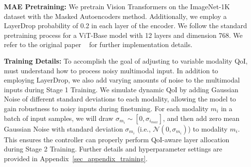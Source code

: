 \textbf{MAE Pretraining:} We pretrain Vision Transformers on the ImageNet-1K dataset with the Masked Autoencoders method. Additionally, we employ a LayerDrop probability of 0.2 in each layer of the encoder. We follow the standard pretraining process for a ViT-Base model with 12 layers and dimension 768. We refer to the original paper ~\cite{he2022masked} for further implementation details. 


\textbf{Training Details:}
To accomplish the goal of adjusting to variable modality QoI, \name must understand how to process noisy multimodal input. 
In addition to employing LayerDrop, we also add varying amounts of noise to the multimodal inputs during Stage 1 Training. We simulate dynamic QoI by adding Gaussian Noise of different standard deviations to each modality, allowing the model to gain robustness to noisy inputs during finetuning. For each modality $m_i$ in a batch of input samples, we will draw $\sigma_{m_i} \sim [0, \sigma_{i_{max}}]$, and then add zero mean Gaussian Noise with standard deviation $\sigma_{m_i}$ (i.e., $\mathcal{N}(0, \sigma_{m_i})$) to modality $m_i$. This ensures the controller can properly perform QoI-aware layer allocation during Stage 2 Training. 
Further details and hyperparameter settings are provided in Appendix~\ref{sec_appendix_training}.








